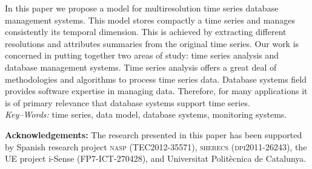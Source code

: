 \documentclass[twocolumn,11pt,a4paper]{article}
\begin{document}
{\begin{minipage}[b]{6.9in}
    In this paper we propose a model for multiresolution time series
    database management systems. This model stores compactly a time series
    and manages consistently its temporal dimension. This is achieved by
    extracting different resolutions and attributes summaries from the
    original time series.
    Our work is concerned in putting together two areas of study: time
    series analysis and database management systems. Time series analysis
    offers a great deal of methodologies and algorithms to process time
    series data. Database systems field provides software expertise in
    managing data. Therefore, for many applications it is of primary
    relevance that database systems support time series.
    \\[4mm] \textit{Key--Words:}
    time series, data model, database systems, monitoring systems.
  \end{minipage}
  \vspace{-10pt}
}

\maketitle

\thispagestyle{empty} \pagestyle{empty}
%
%









\vspace{5pt plus 5pt} 
\noindent \textbf{Acknowledgements:} The research presented in this
paper has been supported by Spanish research project \textsc{nasp
  (TEC2012-35571)}, \textsc{sherecs (dpi2011-26243)}, the UE project
i-Sense ({\small FP7-ICT-270428}), and Universitat Polit\`{e}cnica de
Catalunya.


\printbibliography{}
\end{document}
